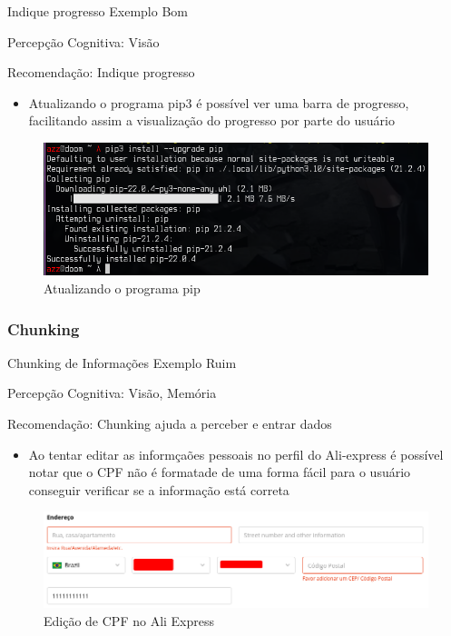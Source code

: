 \documentclass{beamer}
\begin{document}
\begin{frame}{Indique progresso Exemplo Bom}

Percepção Cognitiva: Visão

Recomendação: Indique progresso

\begin{itemize}
    \item Atualizando o programa pip3 é possível ver uma barra de progresso, facilitando assim a visualização do progresso por parte do usuário
\end{itemize}
\begin{figure}
    \centering
    \includegraphics[scale=0.4]{images/python-pip.png}
    \caption{Atualizando o programa pip}
\end{figure}

\end{frame}

\subsubsection{Chunking}

\begin{frame}{Chunking de Informações Exemplo Ruim}

Percepção Cognitiva: Visão, Memória

Recomendação: Chunking ajuda a perceber e entrar dados

\begin{itemize}
    \item Ao tentar editar as informçaões pessoais no perfil do Ali-express é possível notar que o CPF não é formatade de uma forma fácil para o usuário conseguir verificar se a informação está correta
\end{itemize}
\begin{figure}
    \centering
    \includegraphics[scale=0.4]{images/Ali-express.png}
    \caption{Edição de CPF no Ali Express}
\end{figure}
\end{frame}
\end{document}
